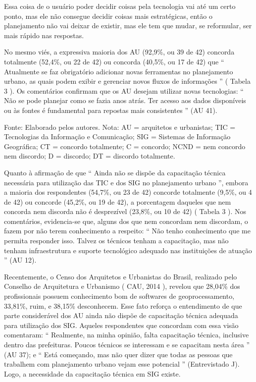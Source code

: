 \documentclass{article}
\begin{document}
Essa coisa de o usuário poder decidir coisas pela tecnologia vai até um certo
						ponto, mas ele não consegue decidir coisas mais estratégicas, então o
						planejamento não vai deixar de existir, mas ele tem que mudar, se
						reformular, ser mais rápido nas respostas.

No mesmo viés, a expressiva maioria dos AU (92,9\%, ou 39 de 42) concorda
					totalmente (52,4\%, ou 22 de 42) ou concorda (40,5\%, ou 17 de 42) que
						“%
Atualmente se faz obrigatório adicionar novas ferramentas no
						planejamento urbano, as quais podem exibir e gerenciar novos fluxos de
						informações%
” (%
Tabela 3%
). Os
					comentários confirmam que os AU desejam utilizar novas tecnologias: “%
Não
						se pode planejar como se fazia anos atrás. Ter acesso aos dados disponíveis
						ou às fontes é fundamental para repostas mais consistentes%
” (AU
					41).

Fonte: Elaborado pelos autores. Nota: AU = arquitetos e urbanistas;
								TIC = Tecnologias da Informação e Comunicação; SIG = Sistemas de
								Informação Geográfica; CT = concordo totalmente; C = concordo; NCND
								= nem concordo nem discordo; D = discordo; DT = discordo
								totalmente.

Quanto à afirmação de que “%
Ainda não se dispõe da capacitação técnica
						necessária para utilização das TIC e dos SIG no planejamento
					urbano%
”, embora a maioria dos respondentes (54,7\%, ou 23 de 42)
					concorde totalmente (9,5\%, ou 4 de 42) ou concorde (45,2\%, ou 19 de 42), a
					porcentagem daqueles que nem concorda nem discorda não é desprezível (23,8\%, ou
					10 de 42) (%
Tabela 3%
). Nos comentários,
					evidencia-se que, alguns dos que nem concordam nem discordam, o fazem por não
					terem conhecimento a respeito: “%
Não tenho conhecimento que me permita
						responder isso. Talvez os técnicos tenham a capacitação, mas não tenham
						infraestrutura e suporte tecnológico adequado nas instituições de
						atuação%
” (AU 12).

Recentemente, o Censo dos Arquitetos e Urbanistas do Brasil, realizado pelo
					Conselho de Arquitetura e Urbanismo (%
CAU,
						2014%
), revelou que 28,04\% dos profissionais possuem conhecimento bom
					de %
softwares%
 de geoprocessamento, 33,81\%, ruim, e 38,15\%
					desconhecem. Esse fato reforça o entendimento de que parte considerável dos AU
					ainda não dispõe de capacitação técnica adequada para utilização dos SIG.
					Aqueles respondentes que concordam com essa visão comentaram:
						“%
Realmente, na minha opinião, falta capacitação técnica, inclusive
						dentro das prefeituras. Poucos técnicos se interessam e se capacitam nesta
						área%
” (AU 37); e “%
Está começando, mas não quer dizer que
						todas as pessoas que trabalhem com planejamento urbano vejam esse
						potencial%
” (Entrevistado J). Logo, a necessidade da capacitação
					técnica em SIG existe.
\end{document}
